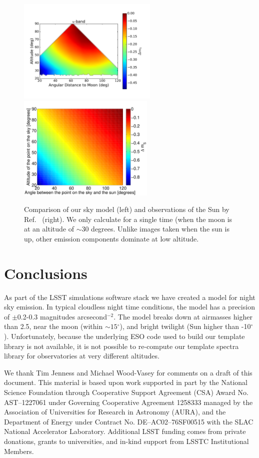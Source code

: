\documentclass[]{spie}
\newcommand\degree{{^\circ}}
\begin{document}
\begin{figure}
  \begin{center}
  \includegraphics[height=5cm]{plots/deltam5.pdf}\includegraphics[height=5cm]{plots/a1_alt_angle_meshgrid.pdf}
  \end{center}
  \caption{ Comparison of our sky model (left) and observations of the Sun by Ref.~ (right).  We only calculate for a single time (when the moon is at an altitude of $\sim 30$ degrees. Unlike images taken when the sun is up, other emission components dominate at low altitude.  \label{fig:cCompare}}
\end{figure}

\section{Conclusions}

As part of the LSST simulations software stack we have created a model for night sky emission.  In typical cloudless night time conditions, the model has a precision of $\pm$0.2-0.3 magnitudes arcsecond$^{-2}$. The model breaks down at airmasses higher than 2.5, near the moon (within $\sim15\degree$), and bright twilight (Sun higher than -10$\degree$).  Unfortunately, because the underlying ESO code used to build our template library is not available, it is not possible to re-compute our template spectra library for observatories at very different altitudes.  

\acknowledgments        
 
We thank Tim Jenness and Michael Wood-Vasey for comments on a draft of this document.  This material is based upon work supported in part by the National Science Foundation through Cooperative Support Agreement (CSA) Award No. AST–1227061 under Governing Cooperative Agreement 1258333 managed by the Association of Universities for Research in Astronomy (AURA), and the Department of Energy under Contract No. DE–AC02–76SF00515 with the SLAC National Accelerator Laboratory. Additional LSST funding comes from private donations, grants to universities, and in-kind support from LSSTC Institutional Members.



\end{document}
